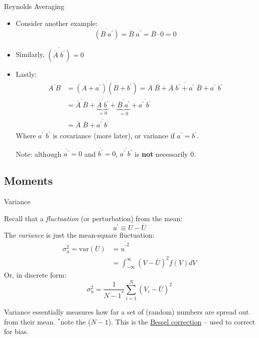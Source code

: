 \begin{frame}{Reynolds Averaging}

\begin{itemize}
	\item Consider another example:
	$$\overline{(\overline{B}\;a^\prime)} = \overline{B}\; \overline{a^\prime} = \overline{B}\cdot 0 = 0$$
	\item Similarly, $\overline{(\overline{A}\;b^\prime)} = 0$
	\item Lastly:
	\begin{align*}
	\overline{A\; B} &= \overline{(A + a^\prime)(B+ b^\prime)} = \overline{\overline{A}\; \overline{B} + \overline{A}\; b^\prime + a^\prime\; \overline{B} + a^\prime\; b^\prime}\\
	& = \overline{\overline{A}\; \overline{B}} + \underbrace{\overline{\overline{A}\; b^\prime}}_{=0} + \underbrace{\overline{\overline{B}\; a^\prime}}_{=0} + \overline{a^\prime\; b^\prime}\\
	&= \overline{A}\;\overline{B} + \overline{a^\prime\; b^\prime}
	\end{align*}
	Where $\overline{a^\prime\; b^\prime}$ is covariance (more later), or variance if $a^\prime = b^\prime$. 
	
	Note: although $\overline{a^\prime}=0$ and $\overline{b^\prime}=0$, $\overline{a^\prime\; b^\prime}$ is \textbf{not} necessarily 0.
\end{itemize}
\end{frame}

\subsection{Moments}
\begin{frame}{Variance}

Recall that a \textit{fluctuation} (or perturbation) from the mean:
$$u^\prime \equiv U - \overline{U}$$
The \textit{variance} is just the mean-square fluctuation:
\begin{align*}
\sigma_u^2 = \text{var}(U) &= \overline{{u^\prime}^2}\\
&= \int^{\infty}_{-\infty} (V - \overline{U})^2 f(V) dV 
\end{align*}
Or, in discrete form:
$$\sigma_u^2 = \frac{1}{N-1^*} \sum^N_{i=1} (V_i - \overline{U})^2$$

Variance essentially measures how far a set of (random) numbers are spread out from their mean.
\newline\newline
\scriptsize{$^*$note the ($N-1$). This is the \href{https://en.wikipedia.org/wiki/Bessel\%27s_correction}{\color{UUcrimson}\underline{Bessel correction}} -- used to correct for bias.}

\end{frame}

